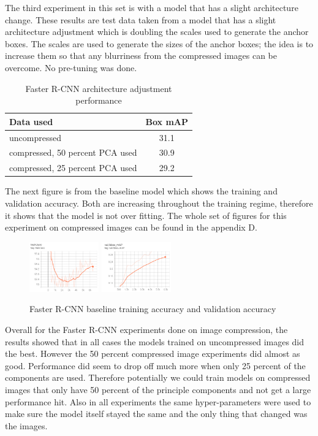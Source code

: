 \documentclass[10pt,twocolumn,letterpaper]{article}
\begin{document}
The third experiment in this set is with a model that has a slight architecture change. These results are test data taken from a model that has a slight architecture adjustment which is doubling the scales used to generate the anchor boxes. The scales are used to generate the sizes of the anchor boxes; the idea is to increase them so that any blurriness from the compressed images can be overcome. No pre-tuning was done. 

\begin{table}[hbt!]
\begin{center}
\begin{tabular}{|l|c|}
\hline
Data used   & Box mAP \\
\hline\hline
uncompressed & 31.1 \\
compressed, 50 percent PCA used & 30.9 \\
compressed, 25 percent PCA used & 29.2 \\
\hline
\end{tabular}
\end{center}
\caption{Faster R-CNN architecture adjustment performance}
\end{table}

The next figure is from the baseline model which shows the training and validation accuracy. Both are increasing throughout the training regime, therefore it shows that the model is not over fitting. The whole set of figures for this experiment on compressed images can be found in the appendix D. 

\begin{figure}[H]
    \centering
    {{\includegraphics[width=3cm]{docs/latex/images/larry/base_results_train_acc.png} }}
    \qquad
    {{\includegraphics[width=3cm]{docs/latex/images/larry/base_results_val.png} }}
    \caption{Faster R-CNN baseline training accuracy and validation accuracy}
    \label{fig:example}
\end{figure}

Overall for the Faster R-CNN experiments done on image compression, the results showed that in all cases the models trained on uncompressed images did the best. However the 50 percent compressed image experiments did almost as good. Performance did seem to drop off much more when only 25 percent of the components are used. Therefore potentially we could train models on compressed images that only have 50 percent of the principle components and not get a large performance hit. Also in all experiments the same hyper-parameters were used to make sure the model itself stayed the same and the only thing that changed was the images. 
\end{document}
